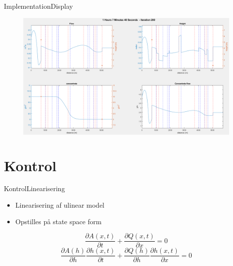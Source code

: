 \begin{frame}{Implementation}{Display}
     \begin{figure}[h]
 \centering
 \includegraphics[width=1.0 \textwidth]{figures/display_result_matlab.png}
 \caption{%
 }
 \label{fig:display_result_matlab}
 \end{figure}
\end{frame}


\section{Kontrol}

\begin{frame}{Kontrol}{Linearisering}
 \vfill\vfill\centering    
\begin{itemize}
	\item Linearisering af ulinear model
	\item Opstilles på state space form

\end{itemize}
\begin{equation}\label{eq:linearization_Continuity}
\frac{\partial A(x,t)}{\partial t} + \frac{\partial Q(x,t)}{\partial x}=0
\end{equation}
\begin{equation}
	\frac{\partial A(h)}{\partial h}\frac{\partial h(x,t)}{\partial t} + \frac{\partial Q(h)}{\partial h}\frac{\partial h(x,t)}{\partial x}=0
\end{equation}
\vfill\vfill
\end{frame}

